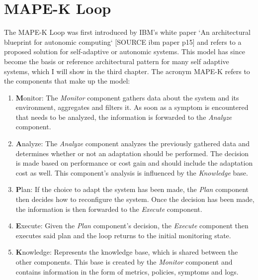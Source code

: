     \section{MAPE-K Loop}
    The MAPE-K Loop was first introduced by IBM's white paper `An architectural blueprint for autonomic computing` [SOURCE ibm paper p15]
    and refers to a proposed solution for self-adaptive or autonomic systems.
    This model has since become the basis or reference architectural pattern for many self adaptive systems, which I will show in the third chapter.
    The acronym MAPE-K refers to the components that make up the model:
    \begin{enumerate}
        \item \textbf{M}onitor: 
            The \textit{Monitor} component gathers data about the system and its environment, aggregates and filters it.
            As soon as a symptom is encountered that needs to be analyzed, the information is forwarded to the \textit{Analyze} component.
        \item \textbf{A}nalyze: 
            The \textit{Analyze} component analyzes the previously gathered data and determines whether or not an adaptation should be performed.
            The decision is made based on performance or cost gain and should include the adaptation cost as well.
            This component's analysis is influenced by the \textit{Knowledge} base.
        \item \textbf{P}lan: 
            If the choice to adapt the system has been made, the \textit{Plan} component then decides how to reconfigure the system.
            Once the decision has been made, the information is then forwarded to the \textit{Execute} component.
        \item \textbf{E}xecute: 
            Given the \textit{Plan} component's decision, the \textit{Execute} component then executes said plan and the loop returns to the initial monitoring state.
        \item \textbf{K}nowledge: 
            Represents the knowledge base, which is shared between the other components.
            This base is created by the \textit{Monitor} component and contains information in the form of metrics, policies, symptoms and logs.
    \end{enumerate}

